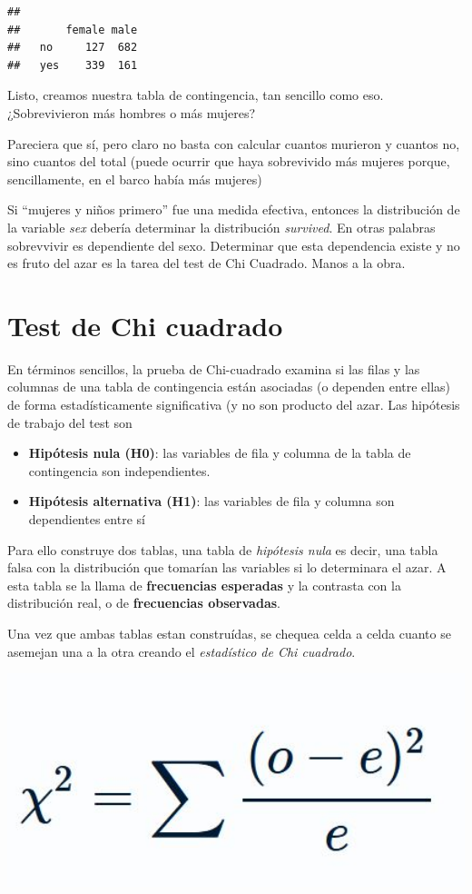 \documentclass[
]{book}
\begin{document}
\begin{verbatim}
##      
##       female male
##   no     127  682
##   yes    339  161
\end{verbatim}

Listo, creamos nuestra tabla de contingencia, tan sencillo como eso.
¿Sobrevivieron más hombres o más mujeres?

Pareciera que sí, pero claro no basta con calcular cuantos murieron y cuantos no, sino cuantos del total (puede ocurrir que haya sobrevivido más mujeres porque, sencillamente, en el barco había más mujeres)

Si ``mujeres y niños primero'' fue una medida efectiva, entonces la distribución de la variable \emph{sex} debería determinar la distribución \emph{survived}. En otras palabras sobrevvivir es dependiente del sexo. Determinar que esta dependencia existe y no es fruto del azar es la tarea del test de Chi Cuadrado. Manos a la obra.

\hypertarget{test-de-chi-cuadrado}{%
\section{Test de Chi cuadrado}\label{test-de-chi-cuadrado}}

En términos sencillos, la prueba de Chi-cuadrado examina si las filas y las columnas de una tabla de contingencia están asociadas (o dependen entre ellas) de forma estadísticamente significativa (y no son producto del azar. Las hipótesis de trabajo del test son

\begin{itemize}
\item
  \textbf{Hipótesis nula (H0)}: las variables de fila y columna de la tabla de contingencia son independientes.
\item
  \textbf{Hipótesis alternativa (H1)}: las variables de fila y columna son dependientes entre sí
\end{itemize}

Para ello construye dos tablas, una tabla de \emph{hipótesis nula} es decir, una tabla falsa con la distribución que tomarían las variables si lo determinara el azar. A esta tabla se la llama de \textbf{frecuencias esperadas} y la contrasta con la distribución real, o de \textbf{frecuencias observadas}.

Una vez que ambas tablas estan construídas, se chequea celda a celda cuanto se asemejan una a la otra creando el \emph{estadístico de Chi cuadrado}.

\includegraphics[width=5.83in]{img/chi_2}
\end{document}
